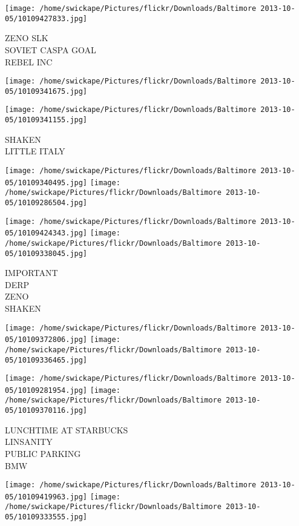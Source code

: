 \documentclass[10pt,letterpaper]{article}
\begin{document}
\vspace{0.25in}
\texttt{[image: /home/swickape/Pictures/flickr/Downloads/Baltimore 2013-10-05/10109427833.jpg]}

ZENO SLK\\
SOVIET CASPA GOAL\\
REBEL INC
\pagebreak

\texttt{[image: /home/swickape/Pictures/flickr/Downloads/Baltimore 2013-10-05/10109341675.jpg]}

\vspace{0.25in}
\texttt{[image: /home/swickape/Pictures/flickr/Downloads/Baltimore 2013-10-05/10109341155.jpg]}

SHAKEN\\
LITTLE ITALY
\pagebreak

\texttt{[image: /home/swickape/Pictures/flickr/Downloads/Baltimore 2013-10-05/10109340495.jpg]}
\texttt{[image: /home/swickape/Pictures/flickr/Downloads/Baltimore 2013-10-05/10109286504.jpg]}

\texttt{[image: /home/swickape/Pictures/flickr/Downloads/Baltimore 2013-10-05/10109424343.jpg]}
\texttt{[image: /home/swickape/Pictures/flickr/Downloads/Baltimore 2013-10-05/10109338045.jpg]}

IMPORTANT\\
DERP\\
ZENO\\
SHAKEN
\pagebreak

\texttt{[image: /home/swickape/Pictures/flickr/Downloads/Baltimore 2013-10-05/10109372806.jpg]}
\texttt{[image: /home/swickape/Pictures/flickr/Downloads/Baltimore 2013-10-05/10109336465.jpg]}

\texttt{[image: /home/swickape/Pictures/flickr/Downloads/Baltimore 2013-10-05/10109281954.jpg]}
\texttt{[image: /home/swickape/Pictures/flickr/Downloads/Baltimore 2013-10-05/10109370116.jpg]}

LUNCHTIME AT STARBUCKS\\
LINSANITY\\
PUBLIC PARKING\\
BMW
\pagebreak

\texttt{[image: /home/swickape/Pictures/flickr/Downloads/Baltimore 2013-10-05/10109419963.jpg]}
\texttt{[image: /home/swickape/Pictures/flickr/Downloads/Baltimore 2013-10-05/10109333555.jpg]}
\end{document}

